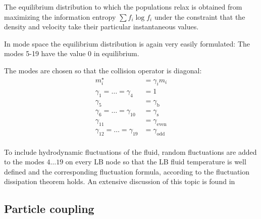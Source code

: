 The equilibrium distribution to which the populations relax 
is obtained from maximizing the information entropy 
$\sum f_i \log f_i$ under the constraint that the density
and velocity take their particular instantaneous 
values. 


In mode space the equilibrium distribution is again very 
easily formulated: The modes 5-19 have the value 0 in equilibrium.

The modes are chosen so that the collision operator is diagonal:
\begin{align*}
  m^\star_i &= \gamma_i m_i  \\
  \gamma_1=\dots=\gamma_4&=1 \\
  \gamma_5&=\gamma_\text{b} \\
  \gamma_6=\dots=\gamma_{10}&=\gamma_\text{s} \\
  \gamma_{11}&=\gamma_\text{even} \\
  \gamma_{12}=\dots = \gamma_{19}&=\gamma_\text{odd} \\
\end{align*}

To include hydrodynamic fluctuations of the fluid, 
random fluctuations are added to the modes $4\dots 19$ on every LB node so that
the LB fluid temperature is well defined and the corresponding
fluctuation formula, according to the fluctuation dissipation theorem holds.
An extensive discussion of this topic is found in \cite{duenweg07a}

\subsection*{Particle coupling}

